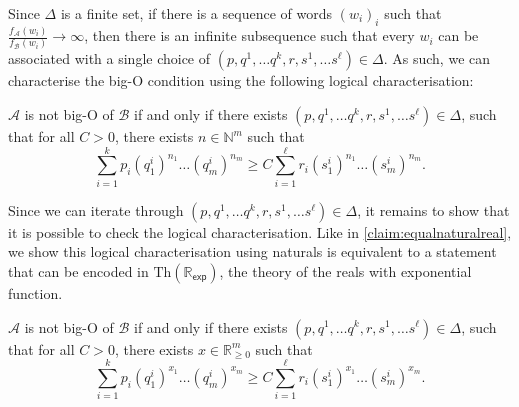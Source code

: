 \documentclass[10pt,a4paper]{amsart}
\numberwithin{equation}{section}
\theoremstyle{plain}
\theoremstyle{definition}
\theoremstyle{remark}
\newcommand{\rexp}{$\mathrm{Th}(\mathbb R_{\mathsf{exp}})$}
\begin{document}
Since $\Delta$ is a finite set, if there is a sequence of words $(w_i)_i$ such that $\frac{f_\mathcal{A}(w_i)}{f_\mathcal{B}(w_i)} \to\infty$, then there is an infinite subsequence such that every $w_i$ can be associated with a single choice of $({p},{q}^1,\dots {q}^{k}, {r},{s}^1,\dots {s}^{\ell}) \in \Delta$. As such, we can characterise the big-O condition using the following logical characterisation:
\begin{lem}
$\mathcal{A}$ is not big-O of $\mathcal{B}$ if and only if there exists $({p},{q}^1,\dots {q}^{k}, {r},{s}^1,\dots {s}^{\ell}) \in \Delta$, such that for all $C > 0$, there exists ${n} \in \mathbb{N}^m$ such that  \[ \sum_{i=1}^{k} p_i{({q}^i_1)}^{n_1}\dots {({q}^i_m)}^{n_m} \ge C\sum_{i=1}^{\ell} r_i{({s}^i_1)}^{n_1}\dots {({s}^i_m)}^{n_m}.\]
\end{lem}
Since we can iterate through $({p},{q}^1,\dots {q}^{k}, {r},{s}^1,\dots {s}^{\ell}) \in \Delta$, it remains to show that it is possible to check the logical characterisation. Like in \cref{claim:equalnaturalreal}, we show this logical characterisation using naturals is equivalent to a statement that  can be encoded in \rexp, the theory of the reals with exponential function.

\begin{lem}\label{lemma:finrealversion}
$\mathcal{A}$ is not big-O of $\mathcal{B}$ if and only if there exists $({p},{q}^1,\dots {q}^{k}, {r},{s}^1,\dots {s}^{\ell}) \in \Delta$, such that for all $C > 0$, there exists ${x} \in \mathbb{R}_{\ge 0}^m$ such that  \[ \sum_{i=1}^{k} p_i{({q}^i_1)}^{x_1}\dots {({q}^i_m)}^{x_m} \ge C \sum_{i=1}^{\ell} r_i{({s}^i_1)}^{x_1}\dots {({s}^i_m)}^{x_m}.\]
\end{lem}
\end{document}
